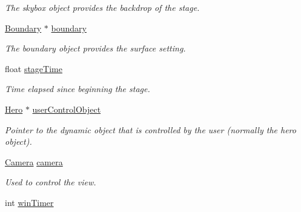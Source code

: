 \begin{DoxyCompactItemize}
\begin{DoxyCompactList}\small\item\em The skybox object provides the backdrop of the stage. \end{DoxyCompactList}\item 
\hyperlink{class_boundary}{Boundary} $\ast$ \hyperlink{class_stage_a7e88ab3e92a9e1b4d12fc867a22ad99f}{boundary}\hypertarget{class_stage_a7e88ab3e92a9e1b4d12fc867a22ad99f}{}\label{class_stage_a7e88ab3e92a9e1b4d12fc867a22ad99f}

\begin{DoxyCompactList}\small\item\em The boundary object provides the surface setting. \end{DoxyCompactList}\item 
float \hyperlink{class_stage_ad88ab19f6d546610c52c564d4326092d}{stage\+Time}\hypertarget{class_stage_ad88ab19f6d546610c52c564d4326092d}{}\label{class_stage_ad88ab19f6d546610c52c564d4326092d}

\begin{DoxyCompactList}\small\item\em Time elapsed since beginning the stage. \end{DoxyCompactList}\item 
\hyperlink{class_hero}{Hero} $\ast$ \hyperlink{class_stage_a756489b3e5916985247b3e411a9f8622}{user\+Control\+Object}\hypertarget{class_stage_a756489b3e5916985247b3e411a9f8622}{}\label{class_stage_a756489b3e5916985247b3e411a9f8622}

\begin{DoxyCompactList}\small\item\em Pointer to the dynamic object that is controlled by the user (normally the hero object). \end{DoxyCompactList}\item 
\hyperlink{class_camera}{Camera} \hyperlink{class_stage_a88bbb5be32cbda115a81dab24b2d4339}{camera}\hypertarget{class_stage_a88bbb5be32cbda115a81dab24b2d4339}{}\label{class_stage_a88bbb5be32cbda115a81dab24b2d4339}

\begin{DoxyCompactList}\small\item\em Used to control the view. \end{DoxyCompactList}\item 
int \hyperlink{class_stage_a3f43ef5fd16f416045a8a5f073d5edd6}{win\+Timer}\hypertarget{class_stage_a3f43ef5fd16f416045a8a5f073d5edd6}{}\label{class_stage_a3f43ef5fd16f416045a8a5f073d5edd6}


\end{DoxyCompactItemize}
